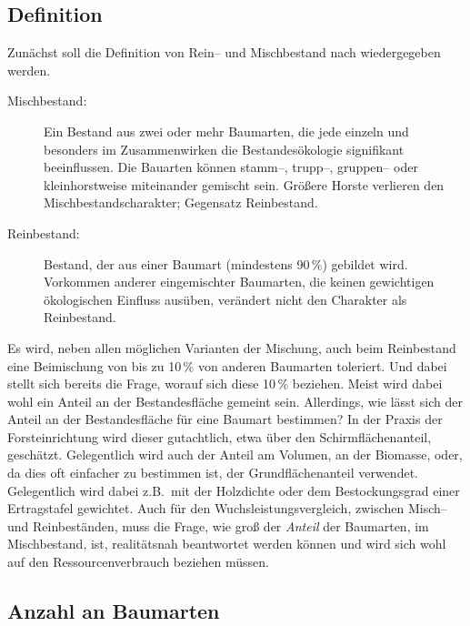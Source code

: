 \documentclass[twocolumn]{scrartcl}
\begin{document}
\subsection{Definition}
\label{ssec:definition}

Zunächst soll die Definition von Rein-- und Mischbestand nach
\cite{bruenig1980WaldbaulicheTerminologi} wiedergegeben werden.
\begin{description}
\item[Mischbestand:] Ein Bestand aus
  zwei oder mehr Baumarten, die jede einzeln und besonders im
  Zusammenwirken die Bestandesökologie signifikant beeinflussen. Die
  Bauarten können stamm--, trupp--, gruppen-- oder kleinhorstweise
  miteinander gemischt sein. Größere Horste verlieren den
  Mischbestandscharakter; Gegensatz Reinbestand.
\item[Reinbestand:] Bestand, der aus
  einer Baumart (mindestens 90\,\%) gebildet wird. Vorkommen anderer
  eingemischter Baumarten, die keinen gewichtigen ökologischen
  Einfluss ausüben, verändert nicht den Charakter als Reinbestand.
\end{description}

Es wird, neben allen möglichen Varianten der Mischung, auch beim
Reinbestand eine Beimischung von bis zu 10\,\% von anderen Baumarten
toleriert. Und dabei stellt sich bereits die Frage, worauf sich diese
10\,\% beziehen. Meist wird dabei wohl ein Anteil an der
Bestandesfläche gemeint sein. Allerdings, wie lässt sich der Anteil an
der Bestandesfläche für eine Baumart bestimmen? In der Praxis der
Forsteinrichtung wird dieser gutachtlich, etwa über den
Schirmflächenanteil, geschätzt. Gelegentlich wird auch der Anteil am
Volumen, an der Biomasse, oder, da dies oft einfacher zu bestimmen
ist, der Grundflächenanteil verwendet. Gelegentlich wird dabei z.B.\
mit der Holzdichte oder dem Bestockungsgrad einer Ertragstafel
gewichtet. Auch für den Wuchsleistungsvergleich, zwischen Misch-- und
Reinbeständen, muss die Frage, wie groß der \emph{Anteil} der
Baumarten, im Mischbestand, ist, realitätsnah beantwortet werden
können und wird sich wohl auf den Ressourcenverbrauch beziehen müssen.

\subsection{Anzahl an Baumarten}
\label{ssec:anzahlBaumarten}
\end{document}

